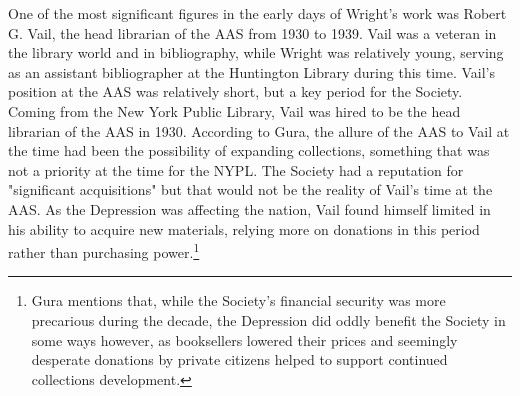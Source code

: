 One of the most significant figures in the early days of Wright's work was Robert G. Vail, the head librarian of the AAS from 1930 to 1939. Vail was a veteran in the library world and in bibliography, while Wright was relatively young, serving as an assistant bibliographer at the Huntington Library during this time. Vail's position at the AAS was relatively short, but a key period for the Society. Coming from the New York Public Library, Vail was hired to be the head librarian of the AAS in 1930. According to Gura, the allure of the AAS to Vail at the time had been the possibility of expanding collections, something that was not a priority at the time for the NYPL. The Society had a reputation for "significant acquisitions" but that would not be the reality of Vail's time at the AAS. As the Depression was affecting the nation, Vail found himself limited in his ability to acquire new materials, relying more on donations in this period rather than purchasing power.\footnote{Gura mentions that, while the Society's financial security was more precarious during the decade, the Depression did oddly benefit the Society in some ways however, as booksellers lowered their prices and seemingly desperate donations by private citizens helped to support continued collections development.\autocite[225]{gura_american_2012}} 

